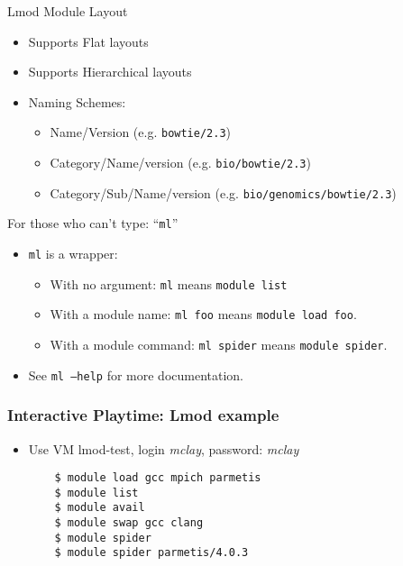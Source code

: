 \documentclass{beamer}
\begin{document}
\begin{frame}{Lmod Module Layout}
  \begin{itemize}
    \item Supports Flat layouts
    \item Supports Hierarchical layouts
    \item Naming Schemes:
      \begin{itemize}
        \item Name/Version (e.g. \texttt{bowtie/2.3})
        \item Category/Name/version (e.g. \texttt{bio/bowtie/2.3})
        \item Category/Sub/Name/version (e.g. \texttt{bio/genomics/bowtie/2.3})
      \end{itemize}
  \end{itemize}
\end{frame}

\begin{frame}{For those who can't type: ``\texttt{ml}''}
  \begin{itemize}
    \item \texttt{ml} is a wrapper:
      \begin{itemize}
        \item With no argument: \texttt{ml} means \texttt{module list}
        \item With a module name: \texttt{ml foo} means \texttt{module
            load foo}.
        \item With a module command: \texttt{ml spider} means
          \texttt{module spider}.
      \end{itemize}
    \item See \texttt{ml --help} for more documentation.
  \end{itemize}
\end{frame}

\begin{frame}[fragile]
    \frametitle{Interactive Playtime: Lmod example}
  \begin{itemize}
    \item Use VM lmod-test, login \emph{mclay}, password: \emph{mclay}
    {\small
\begin{verbatim}
    $ module load gcc mpich parmetis
    $ module list
    $ module avail
    $ module swap gcc clang
    $ module spider
    $ module spider parmetis/4.0.3
\end{verbatim}
}
  \end{itemize}
\end{frame}
\end{document}
